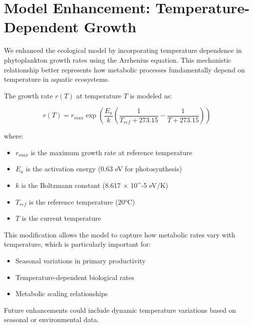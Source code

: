 \section{Model Enhancement: Temperature-Dependent Growth}

We enhanced the ecological model by incorporating temperature dependence in phytoplankton growth rates using the Arrhenius equation. This mechanistic relationship better represents how metabolic processes fundamentally depend on temperature in aquatic ecosystems.

The growth rate $r(T)$ at temperature $T$ is modeled as:

\[
r(T) = r_{max} \exp\left(\frac{E_a}{k}\left(\frac{1}{T_{ref} + 273.15} - \frac{1}{T + 273.15}\right)\right)
\]

where:
\begin{itemize}
\item $r_{max}$ is the maximum growth rate at reference temperature
\item $E_a$ is the activation energy (0.63 eV for photosynthesis)
\item $k$ is the Boltzmann constant (8.617 × 10^{-5} eV/K)
\item $T_{ref}$ is the reference temperature (20°C)
\item $T$ is the current temperature
\end{itemize}

This modification allows the model to capture how metabolic rates vary with temperature, which is particularly important for:
\begin{itemize}
\item Seasonal variations in primary productivity
\item Temperature-dependent biological rates
\item Metabolic scaling relationships
\end{itemize}

Future enhancements could include dynamic temperature variations based on seasonal or environmental data.
